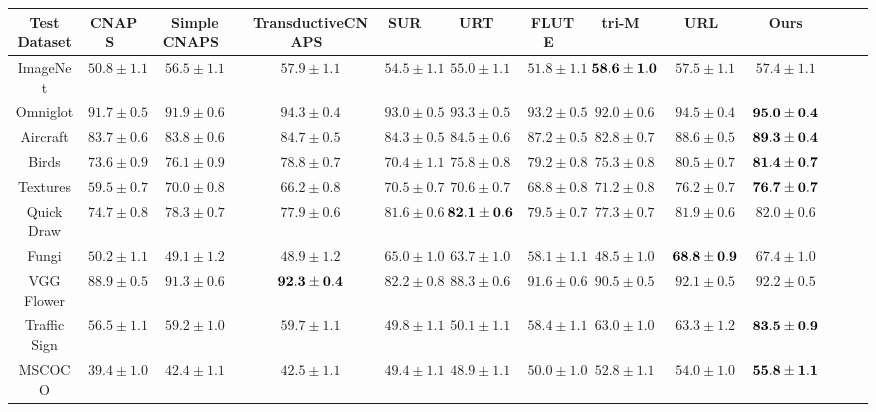 \begin{table*}[h!]
	\centering
    \resizebox{0.95\textwidth}{!}
    {
		\begin{tabular}{ccccccccccccc}

		    \toprule
		    Test Dataset & CNAPS~\cite{requeima2019fast} & Simple CNAPS~\cite{bateni2020improved} & TransductiveCNAPS~\cite{bateni2020enhancing} & SUR~\cite{dvornik2020selecting} & URT~\cite{liu2020universal} & FLUTE~\cite{triantafillou2021flute} & tri-M~\cite{liu2021multi} & URL~\cite{li2021universal} & Ours\\
		    \midrule
			ImageNet & $50.8 \pm 1.1$ & $56.5 \pm 1.1$ & $57.9 \pm 1.1$ & $54.5 \pm 1.1$ & $55.0 \pm 1.1$ & $51.8 \pm 1.1$ & ${\bf 58.6 \pm 1.0}$ & $57.5 \pm 1.1$ & $57.4 \pm 1.1$ \\
			Omniglot & $91.7 \pm 0.5$ & $91.9 \pm 0.6$ & $94.3 \pm 0.4$ & $93.0 \pm 0.5$ & $93.3 \pm 0.5$ & $93.2 \pm 0.5$ & $92.0 \pm 0.6$ & $94.5 \pm 0.4$ & ${\bf 95.0 \pm 0.4}$ \\
			Aircraft & $83.7 \pm 0.6$ & $83.8 \pm 0.6$ & $84.7 \pm 0.5$ & $84.3 \pm 0.5$ & $84.5 \pm 0.6$ & $87.2 \pm 0.5$ & $82.8 \pm 0.7$ & $88.6 \pm 0.5$ & ${\bf 89.3 \pm 0.4}$ \\
			Birds & $73.6 \pm 0.9$ & $76.1 \pm 0.9$ & $78.8 \pm 0.7$ & $70.4 \pm 1.1$ & $75.8 \pm 0.8$ & $79.2 \pm 0.8$ & $75.3 \pm 0.8$ & $80.5 \pm 0.7$ & ${\bf 81.4 \pm 0.7}$ \\
			Textures & $59.5 \pm 0.7$ & $70.0 \pm 0.8$ & $66.2 \pm 0.8$ & $70.5 \pm 0.7$ & $70.6 \pm 0.7$ & $68.8 \pm 0.8$ & $71.2 \pm 0.8$ & $76.2 \pm 0.7$ & ${\bf 76.7 \pm 0.7}$ \\
			Quick Draw & $74.7 \pm 0.8$ & $78.3 \pm 0.7$ & $77.9 \pm 0.6$ & $81.6 \pm 0.6$ & ${\bf 82.1 \pm 0.6}$ & $79.5 \pm 0.7$ & $77.3 \pm 0.7$ & $81.9 \pm 0.6$ & $82.0 \pm 0.6$ \\
			Fungi & $50.2 \pm 1.1$ & $49.1 \pm 1.2$ & $48.9 \pm 1.2$ & $65.0 \pm 1.0$ & $63.7 \pm 1.0$ & $58.1 \pm 1.1$ & $48.5 \pm 1.0$ & ${\bf 68.8 \pm 0.9}$ & $67.4 \pm 1.0$ \\
			VGG Flower & $88.9 \pm 0.5$ & $91.3 \pm 0.6$ & ${\bf 92.3 \pm 0.4}$ & $82.2 \pm 0.8$ & $88.3 \pm 0.6$ & $91.6 \pm 0.6$ & $90.5 \pm 0.5$ & $92.1 \pm 0.5$ & $92.2 \pm 0.5$ \\
			\midrule
			Traffic Sign & $56.5 \pm 1.1$ & $59.2 \pm 1.0$ & $59.7 \pm 1.1$ & $49.8 \pm 1.1$ & $50.1 \pm 1.1$ & $58.4 \pm 1.1$ & $63.0 \pm 1.0$ & $63.3 \pm 1.2$ & ${\bf 83.5 \pm 0.9}$ \\
			MSCOCO & $39.4 \pm 1.0$ & $42.4 \pm 1.1$ & $42.5 \pm 1.1$ & $49.4 \pm 1.1$ & $48.9 \pm 1.1$ & $50.0 \pm 1.0$ & $52.8 \pm 1.1$ & $54.0 \pm 1.0$ & ${\bf 55.8 \pm 1.1}$ \\

\end{tabular}}
\end{table*}
